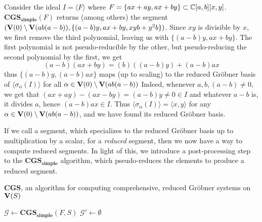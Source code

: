 \begin{example}\upshape
  Consider the ideal $I = \langle F \rangle$ where $F = \{ ax + ay, ax + by \} \subset \mathbb{C}[a, b][x, y]$. $\mathbf{CGS_{simple}}(F)$ returns (among others) the segment $(\operatorname{\mathbf V}(0) \setminus \operatorname{\mathbf V}(ab(a - b)), \{(a - b)y, ax + by, xyb + y^{2}b\})$. Since $xy$ is divisible by $x$, we first remove the third polynomial, leaving us with $\{(a - b)y, ax + by\}$. The first polynomial is not pseudo-reducible by the other, but pseudo-reducing the second polynomial by the first, we get
  \[(a - b)(ax + by) = (b)((a - b)y) + (a - b)ax\]
  thus $\{(a - b)y, (a - b)ax\}$ maps (up to scaling) to the reduced Gröbner basis of $\langle \sigma_{\alpha}(I) \rangle$ for all $\alpha \in \operatorname{\mathbf V}(0) \setminus \operatorname{\mathbf V}(ab(a - b))$ Indeed, whenever $a, b, (a - b) \neq 0$, we get that $(ax + ay) - (ax - by) = (a - b)y \neq 0 \in I$ and whatever $a - b$ is, it divides $a$, hence $(a - b)ax \in I$. Thus $\langle \sigma_{\alpha}(I) \rangle = \langle x, y \rangle$ for any $\alpha \in \operatorname{\mathbf V}(0) \setminus \operatorname{\mathbf V}(ab(a - b))$, and we have found its reduced Gröbner basis.
\end{example}

If we call a segment, which specializes to the reduced Gröbner basis up to multiplication by a scalar, for a \textit{reduced} segment, then we now have a way to compute reduced segments. In light of this, we introduce a post-processing step to the $\mathbf{CGS_{simple}}$ algorithm, which pseudo-reduces the elements to produce a reduced segment.

\begin{algorithm}\label{alg:CGS}
  \caption{$\mathbf{CGS}$, an algorithm for computing comprehensive, reduced Gröbner systems on $\operatorname{\mathbf V}(S)$}
  $\mathcal G \gets \mathbf{CGS_{simple}}(F, S)$\;
  $\mathcal G' \gets \emptyset$\;
  \;
\end{algorithm}

